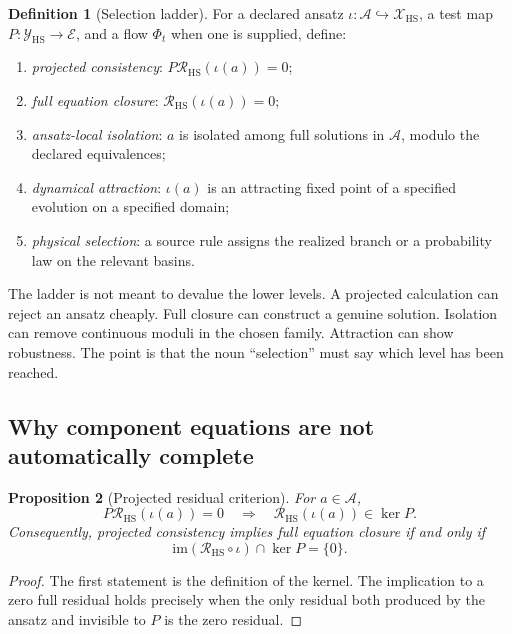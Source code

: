 \documentclass[11pt]{article}
\newcommand{\cA}{\mathcal{A}}
\newcommand{\cE}{\mathcal{E}}
\newcommand{\cR}{\mathcal{R}}
\newcommand{\cX}{\mathcal{X}}
\newcommand{\cY}{\mathcal{Y}}
\newcommand{\im}{\mathrm{im}}
\newcommand{\HS}{\mathrm{HS}}
\numberwithin{equation}{section}
\theoremstyle{definition}
\newtheorem{definition}{Definition}[section]
\theoremstyle{plain}
\newtheorem{proposition}[definition]{Proposition}
\theoremstyle{remark}
\begin{document}
\begin{definition}[Selection ladder]
For a declared ansatz \(\iota:\cA\hookrightarrow\cX_{\HS}\), a test map
\(P:\cY_{\HS}\to\cE\), and a flow \(\Phi_t\) when one is supplied, define:
\begin{enumerate}[label=\textnormal{L\arabic*:},leftmargin=3.4em]
\item \emph{projected consistency}: \(P\cR_{\HS}(\iota(a))=0\);
\item \emph{full equation closure}: \(\cR_{\HS}(\iota(a))=0\);
\item \emph{ansatz-local isolation}: \(a\) is isolated among full solutions
      in \(\cA\), modulo the declared equivalences;
\item \emph{dynamical attraction}: \(\iota(a)\) is an attracting fixed point
      of a specified evolution on a specified domain;
\item \emph{physical selection}: a source rule assigns the realized branch
      or a probability law on the relevant basins.
\end{enumerate}
\end{definition}

The ladder is not meant to devalue the lower levels.  A projected calculation
can reject an ansatz cheaply.  Full closure can construct a genuine solution.
Isolation can remove continuous moduli in the chosen family.  Attraction can
show robustness.  The point is that the noun ``selection'' must say which
level has been reached.

\subsection{Why component equations are not automatically complete}

\begin{proposition}[Projected residual criterion]\label{prop:projected}
For \(a\in\cA\),
\[
P\cR_{\HS}(\iota(a))=0
\quad\Longrightarrow\quad
\cR_{\HS}(\iota(a))\in\ker P.
\]
Consequently, projected consistency implies full equation closure if and only
if
\[
\im(\cR_{\HS}\circ\iota)\cap\ker P=\{0\}.
\tag{3.1}\label{eq:complete-test}
\]
\end{proposition}

\begin{proof}
The first statement is the definition of the kernel.  The implication to a
zero full residual holds precisely when the only residual both produced by
the ansatz and invisible to \(P\) is the zero residual.
\end{proof}
\end{document}
